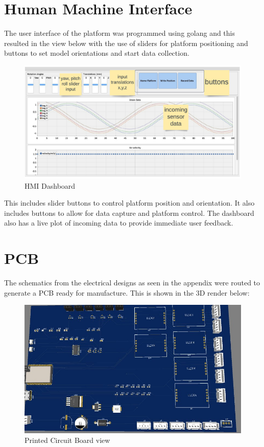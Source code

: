 \section{Human Machine Interface}
The user interface of the platform was programmed using golang and this resulted in the view below with the use of sliders for platform positioning and buttons to set model orientations and start data collection.
\begin{center}
	\begin{figure}[H]
	\centering
	\includegraphics[width=1\linewidth]{Figures/hmi}
	\caption[HMI Dashboard]{HMI Dashboard}
	\end{figure}
\end{center}

This includes slider buttons to control platform position and orientation. It also includes buttons to allow for data capture  and platform control. The dashboard also has a live plot of incoming data to provide immediate user feedback.

\section{PCB}
The schematics from the electrical designs as seen in the appendix were routed to generate a PCB ready for manufacture. This is shown in the 3D render below:
\begin{center}
	\begin{figure}[H]
	\centering
	\includegraphics[width=0.7\linewidth]{Figures/pcb}
	\caption[Printed Circuit Board view]{Printed Circuit Board view}
	\end{figure}
\end{center}
